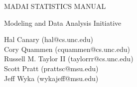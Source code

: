 \documentclass[pdftex,12pt]{article}
\begin{document}
\thispagestyle{empty}

\begin{center}
{\LARGE MADAI STATISTICS MANUAL}\\

\vspace*{6pt}

{\Large Modeling and Data Analysis Initiative}
\date{today}

\vspace*{20pt}

Hal Canary (hal@cs.unc.edu)\\
Cory Quammen (cquammen@cs.unc.edu)\\
Russell M. Taylor II (taylorrr@cs.unc.edu)\\
Scott Pratt (prattsc@msu.edu)\\
Jeff Wyka (wykajeff@msu.edu)

\end{center}

\tableofcontents



\newpage


\newpage


\newpage


\newpage


\newpage


\newpage


\newpage


\newpage


\newpage


%
\end{document}
